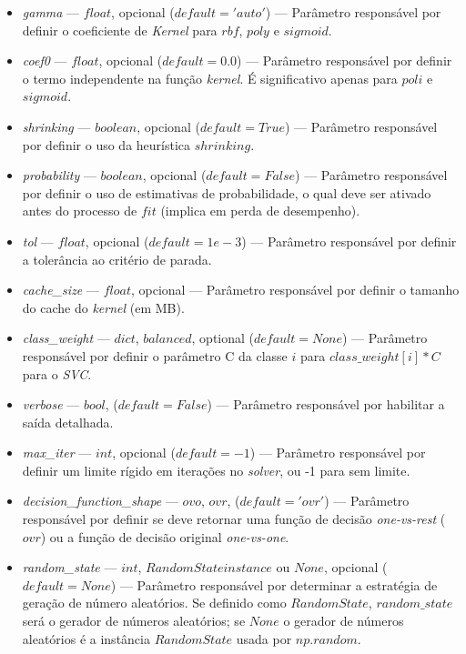 \documentclass[
	12pt,				%
	oneside,			%
	a4paper,			%
	english,			%
	brazil				%
	]{abntex2ppgsi}
\begin{document}
{{\begin{apendicesenv}
\begin{itemize}
\item \textit{gamma} --- $float$, opcional ($default='auto'$) --- Parâmetro responsável por definir o coeficiente de \textit{Kernel} para $rbf$, $poly$ e $sigmoid$.

\item \textit{coef0} --- $float$, opcional ($default=0.0$) --- Parâmetro responsável por definir o termo independente na função \textit{kernel}. É significativo apenas para $poli$ e $sigmoid$.

\item \textit{shrinking} --- $boolean$, opcional ($default=True$) --- Parâmetro responsável por definir o uso da heurística $shrinking$.

\item \textit{probability} --- $boolean$, opcional ($default=False$) --- Parâmetro responsável por definir o uso de estimativas de probabilidade, o qual deve ser ativado antes do processo de $fit$ (implica em perda de desempenho).

\item \textit{tol} --- $float$, opcional ($default=1e-3$) --- Parâmetro responsável por definir a tolerância ao critério de parada.

\item \textit{cache\_size} --- $float$, opcional --- Parâmetro responsável por definir o tamanho do cache do \textit{kernel} (em MB).

\item \textit{class\_weight} --- $dict$, $balanced$, optional ($default = None$) --- Parâmetro responsável  por definir o parâmetro C da classe $i$ para $class\_weight[i]*C$ para o \textit{SVC}.

\item \textit{verbose} --- $bool$, ($default = False$) --- Parâmetro responsável por habilitar a saída detalhada.

\item \textit{max\_iter} --- $int$, opcional ($default=-1$) --- Parâmetro responsável por definir um limite rígido em iterações no \textit{solver}, ou -1 para sem limite.

\item \textit{decision\_function\_shape} --- $ovo$, $ovr$, ($default='ovr'$) --- Parâmetro responsável por definir se deve retornar uma função de decisão \textit{one-vs-rest} ($ovr$) ou a função de decisão original \textit{one-vs-one}.

\item \textit{random\_state} --- $int$, $RandomState instance$ ou $None$, opcional ($default=None$) --- Parâmetro responsável por determinar a estratégia de geração de número aleatórios. Se definido como $RandomState$, $random\_state$ será o gerador de números aleatórios; se $None$ o gerador de números aleatórios é a instância $RandomState$ usada por $np.random$.


\end{itemize}
\end{apendicesenv}}}
\end{document}
